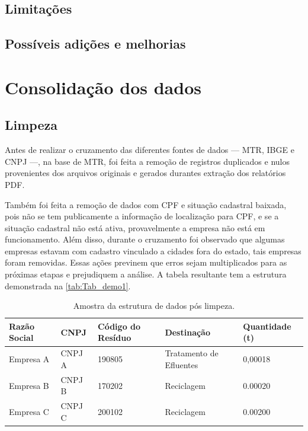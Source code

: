 \subsection{Limitações}

\subsection{Possíveis adições e melhorias}

\section{Consolidação dos dados}\label{section:consolida}

\subsection{Limpeza}

Antes de realizar o cruzamento das diferentes fontes de dados — \gls{MTR}, \gls{IBGE} e \gls{CNPJ} —, na base de \gls{MTR}, foi feita a remoção de registros duplicados e nulos provenientes dos arquivos originais e gerados durantes extração dos relatórios \gls{PDF}. 

Também foi feita a remoção de dados com \gls{CPF} e situação cadastral baixada, pois não se tem publicamente a informação de localização para \gls{CPF}, e se a situação cadastral não está ativa, provavelmente a empresa não está em funcionamento. Além disso, durante o cruzamento foi observado que algumas empresas estavam com cadastro vinculado a cidades fora do estado, tais empresas foram removidas. Essas ações previnem que erros sejam multiplicados para as próximas etapas e prejudiquem a análise. A tabela resultante tem a estrutura demonstrada na \autoref{tab:Tab_demo1}.

\setcounter{table}{0}

\begin{table}[htb]
    \ABNTEXfontereduzida
    \centering
    \caption{Amostra da estrutura de dados pós limpeza. \label{tab:Tab_demo1}}
    \begin{tabular}{@{}lllll@{}}
        \toprule
        \textbf{Razão Social} & \textbf{CNPJ} & \textbf{Código do Resíduo} & \textbf{Destinação} & \textbf{Quantidade (\gls{t})} \\ \midrule
        Empresa A & CNPJ A & 190805 & Tratamento de Efluentes & 0,00018 \\
        Empresa B & CNPJ B & 170202 & Reciclagem              & 0.00020 \\
        Empresa C & CNPJ C & 200102 & Reciclagem              & 0.00200 \\ \bottomrule
        \end{tabular}
\end{table}

